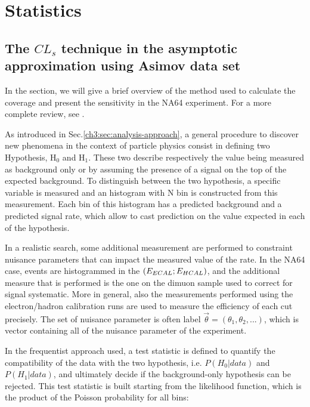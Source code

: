 
\chapter{Statistics} %

\label{AppendixE} %

\section{The $CL_s$ technique in the asymptotic approximation using Asimov data set}

In the section, we will give a brief overview of the method used to calculate the coverage and present the sensitivity in the NA64 experiment. For a more complete review, see \cite{Read_2002,JUNK1999435,Cowan:2010js}.

As introduced in Sec.\ref{ch3:sec:analysis-approach}, a general procedure to discover new phenomena in the context of particle physics consist in defining two Hypothesis, H$_0$ and H$_1$. These two describe respectively the value being measured as background only or by assuming the presence of a signal on the top of the expected background.  To distinguish between the two hypothesis, a specific variable is measured and an histogram with N bin is constructed from this measurement. Each bin of this histogram has a predicted background and a predicted signal rate, which allow to cast prediction on the value expected in each of the hypothesis.

In a realistic search, some additional measurement are performed to constraint nuisance parameters that can impact the measured value of the rate. In the NA64 case, events are histogrammed in the $(E_{ECAL};E_{HCAL})$, and the additional measure that is performed is the one on the dimuon sample used to correct for signal systematic. More in general, also the measurements performed using the electron/hadron calibration runs are used to measure the efficiency of each cut precisely. The set of nuisance parameter is often label $\vec{\theta} = (\theta_1, \theta_2, ...)$, which is vector containing all of the nuisance parameter of the experiment.

In the frequentist approach used, a test statistic is defined to quantify the compatibility of the data with the two hypothesis, i.e. $P(H_0 | data)$ and $P(H_1 | data)$, and ultimately decide if the background-only hypothesis can be rejected. This test statistic is built starting from the likelihood function, which is the product of the Poisson probability for all bins:

